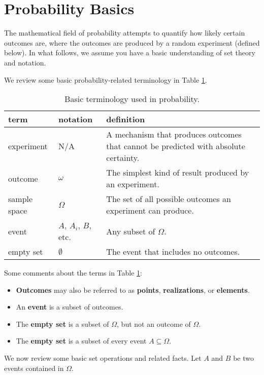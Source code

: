 \documentclass[
]{book}
\providecommand{\tightlist}{%
  \setlength{\itemsep}{0pt}\setlength{\parskip}{0pt}}
\theoremstyle{definition}
\theoremstyle{definition}
\theoremstyle{definition}
\theoremstyle{definition}
\theoremstyle{remark}
\begin{document}
\hypertarget{probability-basics}{%
\section{Probability Basics}\label{probability-basics}}

The mathematical field of probability attempts to quantify how likely certain outcomes are, where the outcomes are produced by a random experiment (defined below). In what follows, we assume you have a basic understanding of set theory and notation.

We review some basic probability-related terminology in Table \ref{tab:prob-tab1}.

\begin{table}

\caption{\label{tab:prob-tab1}Basic terminology used in probability.}
\centering
\begin{tabular}[t]{lll}
\toprule
term & notation & definition\\
\midrule
experiment & N/A & A mechanism that produces outcomes that cannot be predicted with absolute certainty.\\
outcome & $\omega$ & The simplest kind of result produced by an experiment.\\
sample space & $\Omega$ & The set of all possible outcomes an experiment can produce.\\
event & $A$, $A_i$, $B$, etc. & Any subset of $\Omega$.\\
empty set & $\emptyset$ & The event that includes no outcomes.\\
\bottomrule
\end{tabular}
\end{table}

Some comments about the terms in Table \ref{tab:prob-tab1}:

\begin{itemize}
\tightlist
\item
  \textbf{Outcomes} may also be referred to as \textbf{points}, \textbf{realizations}, or \textbf{elements}.
\item
  An \textbf{event} is a subset of outcomes.
\item
  The \textbf{empty set} is a subset of \(\Omega\), but not an outcome of \(\Omega\).
\item
  The \textbf{empty set} is a subset of every event \(A\subseteq \Omega\).
\end{itemize}

We now review some basic set operations and related facts. Let \(A\) and \(B\) be two events contained in \(\Omega\).
\end{document}
